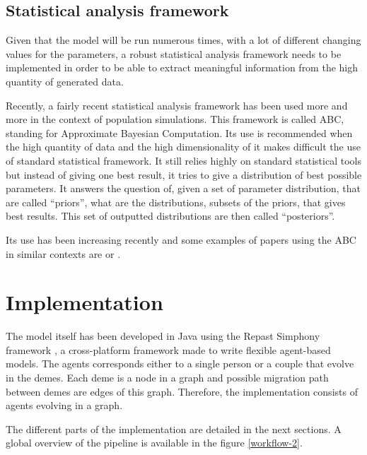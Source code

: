 \documentclass[a4paper,12pt]{report}
\begin{document}
\section{Statistical analysis framework}
Given that the model will be run numerous times, with a lot of different changing values for the parameters, a robust statistical analysis framework needs to be implemented in order to be able to extract meaningful information from the high quantity of generated data.

Recently, a fairly recent statistical analysis framework has been used more and more in the context of population simulations. This framework is called ABC, standing for Approximate Bayesian Computation. Its use is recommended when the high quantity of data and the high dimensionality of it makes difficult the use of standard statistical framework. It still relies highly on standard statistical tools but instead of giving one best result, it tries to give a distribution of best possible parameters. It answers the question of, given a set of parameter distribution, that are called “priors”, what are the distributions, subsets of the priors, that gives best results. This set of outputted distributions are then called “posteriors”.

Its use has been increasing recently and some examples of papers using the ABC in similar contexts are \cite{Gui01} or \cite{Keh01}.

\chapter{Implementation}
The model itself has been developed in Java using the Repast Simphony framework \cite{Nor01}, a cross-platform framework made to write flexible agent-based models. The agents corresponds either to a single person or a couple that evolve in the demes. Each deme is a node in a graph and possible migration path between demes are edges of this graph. Therefore, the implementation consists of agents evolving in a graph.

The different parts of the implementation are detailed in the next sections. A global overview of the pipeline is available in the figure \ref{workflow-2}.

\end{document}
